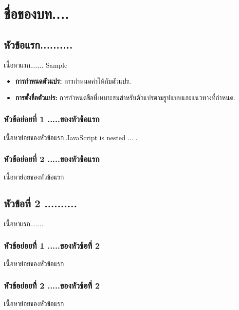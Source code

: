 \chapter{ชื่อของบท....}

\section{หัวข้อแรก..........}
เนื้อหาแรก....... \Gls{Sample}

\begin{tcolorbox}[colframe=gray!60, colback=gray!6, title=แนวคิดสำคัญ:]
\begin{itemize}
\item{ {\bf การกำหนดตัวแปร:} การกำหนดค่าให้กับตัวแปร.}
\item{ {\bf การตั้งชื่อตัวแปร:} การกำหนดชือที่เหมาะสมสำหรับตัวแปรตามรูปแบบและแนวทางที่กำหนด.}
\end{itemize}
\end{tcolorbox}


\subsection{หัวข้อย่อยที่ 1 .....ของหัวข้อแรก}
เนื้อหาย่อยของหัวข้อแรก  JavaScript   is nested ... .\textcite{flanagan2016javascript}

\subsection{หัวข้อย่อยที่ 2 .....ของหัวข้อแรก}
เนื้อหาย่อยของหัวข้อแรก


\section{หัวข้อที่ 2 ..........}
เนื้อหาแรก.......

\subsection{หัวข้อย่อยที่ 1 .....ของหัวข้อที่ 2}
เนื้อหาย่อยของหัวข้อแรก

\subsection{หัวข้อย่อยที่ 2 .....ของหัวข้อที่ 2}
เนื้อหาย่อยของหัวข้อแรก

